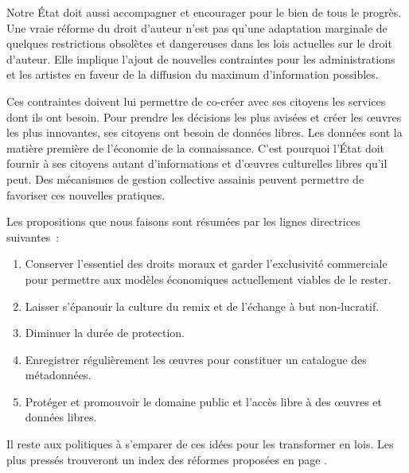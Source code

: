 Notre État doit aussi accompagner et encourager pour le bien de tous le progrès. Une vraie réforme du droit d'auteur n'est pas qu'une adaptation marginale de quelques restrictions obsolètes et dangereuses dans les lois actuelles sur le droit d'auteur. Elle implique l'ajout de nouvelles contraintes pour les administrations et les artistes en faveur de la diffusion du maximum d'information possibles. 

Ces contraintes doivent lui permettre de co-créer avec ses citoyens les services dont ils ont besoin. Pour prendre les décisions les plus avisées et créer les œuvres les plus innovantes, ses citoyens ont besoin de données libres. Les données sont la matière première de l'économie de la connaissance. C'est pourquoi l'État doit fournir à ses citoyens autant d'informations et d'œuvres culturelles libres qu'il peut. Des mécanismes de gestion collective assainis peuvent permettre de favoriser ces nouvelles pratiques.

Les propositions que nous faisons sont résumées par les lignes directrices suivantes~:

\begin{enumerate}
\item Conserver l'essentiel des droits moraux et garder l'exclusivité commerciale pour permettre aux modèles
économiques actuellement viables de le rester.
\item Laisser s'épanouir la culture du remix et de l'échange à but non-lucratif.
\item Diminuer la durée de protection.
\item Enregistrer régulièrement les œuvres pour constituer un catalogue des métadonnées. 
\item Protéger et promouvoir le domaine public et l'accès libre à des œuvres et données libres.
\end{enumerate}

Il reste aux politiques à s'emparer de ces idées pour les transformer en lois. Les plus pressés trouveront un index des réformes proposées en page \pageref{index}.
